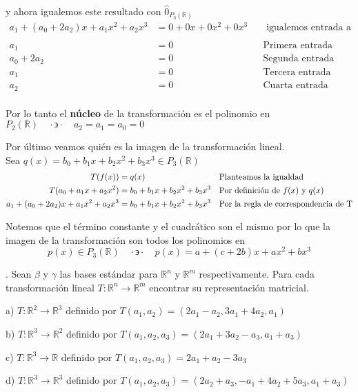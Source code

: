 \documentclass[letterpaper]{article}
\newcommand{\tq}{ \quad \cdot  \backepsilon \cdot \quad }
\newcommand{\R}{\mathds{R}}
\renewcommand{\*}{\cdot}
\theoremstyle{definition}
\begin{document}
	y ahora igualemos este resultado con $ \hat{0}_{P_3 (\R)} $
	\begin{align*}
		 a_1 + (a_0 + 2a_2)x  + a_1 x^2 + a_2 x^3 &= 0 + 0x + 0x^2 + 0x^3 && \text{ igualemos entrada a entrada}\\
		 \\
		 a_1 &= 0 && \text{Primera entrada}\\
		 a_0 + 2a_2 &= 0 && \text{Segunda entrada}\\
		 a_1 &= 0 && \text{Tercera entrada}\\
		 a_2 &= 0 && \text{Cuarta entrada}\\
	\end{align*}
	\begin{center}
		Por lo tanto el \textbf{núcleo} de la transformación es el polinomio en $ P_2 (\R) \tq a_2 = a_1 = a_0 = 0$
	\end{center}
	Por último veamos quién es la imagen de la transformación lineal. \\
	Sea $ q(x) = b_0 + b_1 x + b_2 x^2 + b_3 x^3 \in P_3 (\R)  $
	\begin{align*}
		T(f(x)) & = q(x) && \text{Planteamos la igualdad} \\
		T(a_0 + a_1 x + a_2 x^2) & = b_0 + b_1 x + b_2 x^2 + b_3 x^3 && \text{Por definición de $ f(x) $ y $ q(x) $} \\
		a_1 + (a_0 + 2a_2)x  + a_1 x^2 + a_2 x^3 &= b_0 + b_1 x + b_2 x^2+ b_3 x^3 && \text{Por la regla de correspondencia de T}\\
	\end{align*}
	
	Notemos que el término constante y el cuadrático son el mismo por lo que la imagen de la transformación son todos los polinomios en 
	$$ p(x) \in P_3 (\R) \tq p(x) = a + (c + 2b)x + ax^2 + bx^3  $$
	
	
	. Sean $\beta$ y $\gamma$ las bases estándar para $\mathbb{R}^{n}$ y $\mathbb{R}^{m}$ respectivamente. Para cada transformación lineal $T: \mathbb{R}^{n} \longrightarrow \mathbb{R}^{m}$ encontrar su representación matricial.
	
		a) $T: \mathbb{R}^{2} \longrightarrow \mathbb{R}^{3}$ definido por $T(a_{1},a_{2}) = (2a_{1} - a_{2}, 3a_{1} + 4a_{2},a_{1})$
		
		
		b) $T: \mathbb{R}^{3} \longrightarrow \mathbb{R}^{2}$ definido por 
		$T(a_{1},a_{2},a_{3}) = (2a_{1} + 3a_{2} - a_{3}, a_{1} + a_{3})$
		
		
		c) $T: \mathbb{R}^{3} \longrightarrow \mathbb{R}$ definido por $T(a_{1},a_{2},a_{3}) = 2a_{1} + a_{2} - 3a_{3}$
		
		
		d) $T: \mathbb{R}^{3} \longrightarrow \mathbb{R}^{3}$ definido por $T(a_{1},a_{2},a_{3}) = (2a_{2} + a_{3}, -a_{1} + 4a_{2} + 5a_{3},a_{1} + a_{3})$
\end{document}
